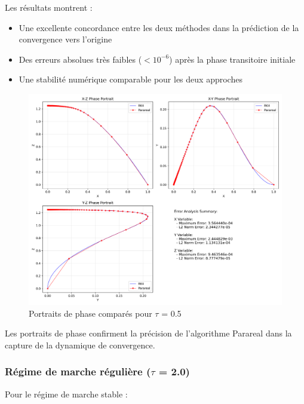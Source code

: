 Les résultats montrent :
\begin{itemize}
    \item Une excellente concordance entre les deux méthodes dans la prédiction de la convergence vers l'origine
    \item Des erreurs absolues très faibles ($< 10^{-6}$) après la phase transitoire initiale
    \item Une stabilité numérique comparable pour les deux approches
\end{itemize}

\begin{figure}[H]
    \centering
    \includegraphics[width=\textwidth]{figures/comparisons/comparison_tau0.5_phase_portraits}
    \caption{Portraits de phase comparés pour $\tau$ = 0.5}
    \label{fig:comp_tau0.5_phase}
\end{figure}

Les portraits de phase confirment la précision de l'algorithme Parareal dans la capture de la dynamique de convergence.

\subsubsection{Régime de marche régulière ($\tau$ = 2.0)}
Pour le régime de marche stable :

